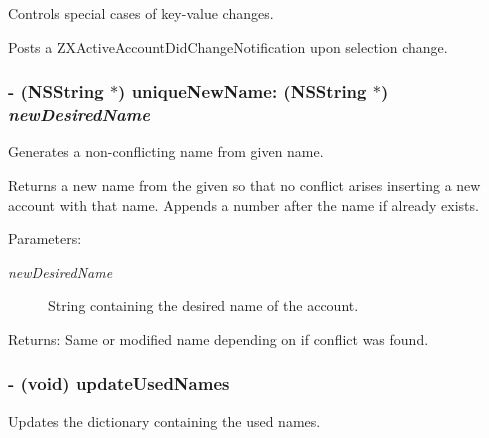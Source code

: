 Controls special cases of key-value changes. 

Posts a ZXActiveAccountDidChangeNotification upon selection change. \hypertarget{interface_z_x_account_controller_0efcea0525fa3f4d189fd52592fab996}{
\subsubsection[{uniqueNewName:}]{\setlength{\rightskip}{0pt plus 5cm}- (NSString $\ast$) uniqueNewName: (NSString $\ast$) {\em newDesiredName}}}
\label{interface_z_x_account_controller_0efcea0525fa3f4d189fd52592fab996}


Generates a non-conflicting name from given name. 

Returns a new name from the given so that no conflict arises inserting a new account with that name. Appends a number after the name if already exists. \begin{Desc}
\item[Parameters:]
\begin{description}
\item[{\em newDesiredName}]String containing the desired name of the account. \end{description}
\end{Desc}
\begin{Desc}
\item[Returns:]Same or modified name depending on if conflict was found. \end{Desc}
\hypertarget{interface_z_x_account_controller_489f46d9731a5b0737b028ea9063e202}{
\subsubsection[{updateUsedNames}]{\setlength{\rightskip}{0pt plus 5cm}- (void) updateUsedNames }}
\label{interface_z_x_account_controller_489f46d9731a5b0737b028ea9063e202}


Updates the dictionary containing the used names. 

